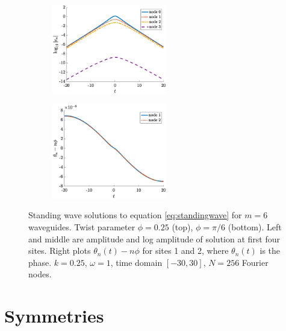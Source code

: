 \documentclass[11pt,reqno]{amsart}
\begin{document}
\begin{figure}
\begin{subfigure}{0.3\linewidth}
    \end{subfigure}
    \begin{subfigure}{0.3\linewidth}
        \caption{}
        \label{fig:m6pi6logamp}
        \includegraphics[width=5cm]{m6phipi6logamp.eps}
    \end{subfigure}
        \begin{subfigure}{0.3\linewidth}
        \caption{}
        \label{fig:m6pi6phase}
        \includegraphics[width=5cm]{m6phipi6phase.eps}
    \end{subfigure}
    \caption{Standing wave solutions to equation \cref{eq:standingwave} for $m=6$ waveguides. Twist parameter $\phi = 0.25$ (top), $\phi = \pi/6$ (bottom). Left and middle are amplitude and log amplitude of solution at first four sites. Right plots $\theta_n(t) - n \phi$ for sites 1 and 2, where $\theta_n(t)$ is the phase. $k=0.25$, $\omega=1$, time domain $[-30,30]$, $N=256$ Fourier nodes.}
    \label{fig:m6sol}
\end{figure}


\appendix

\section{Symmetries}\label{app:symm}
\end{document}
